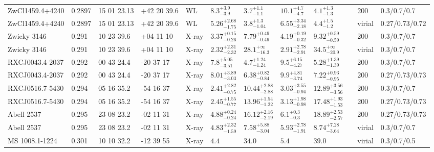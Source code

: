 \begin{landscape}
\begin{center}
{\begin{longtable}{llllllllllll}
ZwCl1459.4+4240 & 0.2897 & 15 01 23.13 & +42 20 39.6 & WL & ${8.3}^{+3.9}_{-3.9}$ & ${3.7}^{+1.1}_{-1.1}$ & ${10.1}^{+4.7}_{-4.7}$ & ${4.1}^{+1.3}_{-1.3}$ & \citet{SE14.1} & 200 & 0.3/0.7/0.7 \\
ZwCl1459.4+4240 & 0.2897 & 15 01 23.13 & +42 20 39.6 & WL & ${5.26}^{+2.68}_{-1.75}$ & ${3.8}^{+1.3}_{-1.04}$ & ${6.55}^{+3.34}_{-2.18}$ & ${4.4}^{+1.5}_{-1.2}$ & \citet{OK10.1} & virial & 0.27/0.73/0.72 \\
Zwicky 3146 & 0.291 & 10 23 39.6 & +04 11 10 & X-ray & ${3.37}^{+0.15}_{-0.26}$ & ${7.79}^{+0.49}_{-0.49}$ & ${4.19}^{+0.19}_{-0.32}$ & ${9.32}^{+0.59}_{-0.59}$ & \citet{ET11.1} & 200 & 0.3/0.7/0.7 \\
Zwicky 3146 & 0.291 & 10 23 39.6 & +04 11 10 & X-ray & ${2.32}^{+2.31}_{-2.32}$ & ${28.1}^{+\infty}_{-16.3}$ & ${2.91}^{+2.78}_{-2.91}$ & ${34.5}^{+\infty}_{-20.9}$ & \citet{SC07.1} & virial & 0.3/0.7/0.7 \\
RXCJ0043.4-2037 & 0.292 & 00 43 24.4 & -20 37 17 & X-ray & ${7.8}^{+5.05}_{-3.51}$ & ${4.7}^{+1.24}_{-1.24}$ & ${9.5}^{+6.15}_{-4.27}$ & ${5.28}^{+1.39}_{-1.39}$ & \citet{ET11.1} & 200 & 0.3/0.7/0.7 \\
RXCJ0043.4-2037 & 0.292 & 00 43 24.4 & -20 37 17 & X-ray & ${8.01}^{+3.89}_{-3.03}$ & ${6.38}^{+0.82}_{-0.84}$ & ${9.9}^{+4.81}_{-3.74}$ & ${7.22}^{+0.93}_{-0.95}$ & \citet{BA14.1} & 200 & 0.27/0.73/0.73 \\
RXCJ0516.7-5430 & 0.294 & 05 16 35.2 & -54 16 37 & X-ray & ${2.41}^{+2.82}_{-0.75}$ & ${10.44}^{+2.88}_{-2.88}$ & ${3.03}^{+3.55}_{-0.94}$ & ${12.89}^{+3.56}_{-3.56}$ & \citet{ET11.1} & 200 & 0.3/0.7/0.7 \\
RXCJ0516.7-5430 & 0.294 & 05 16 35.2 & -54 16 37 & X-ray & ${2.45}^{+1.55}_{-0.77}$ & ${13.96}^{+1.54}_{-1.22}$ & ${3.13}^{+1.98}_{-0.98}$ & ${17.48}^{+1.93}_{-1.53}$ & \citet{BA14.1} & 200 & 0.27/0.73/0.73 \\
Abell 2537 & 0.295 & 23 08 23.2 & -02 11 31 & X-ray & ${4.88}^{+0.24}_{-0.24}$ & ${16.12}^{+2.16}_{-2.19}$ & ${6.1}^{+0.3}_{-0.3}$ & ${18.89}^{+2.53}_{-2.57}$ & \citet{BA14.1} & 200 & 0.27/0.73/0.73 \\
Abell 2537 & 0.295 & 23 08 23.2 & -02 11 31 & X-ray & ${4.83}^{+2.32}_{-1.59}$ & ${7.58}^{+5.88}_{-3.04}$ & ${5.93}^{+2.78}_{-1.91}$ & ${8.74}^{+7.28}_{-3.64}$ & \citet{SC07.1} & virial & 0.3/0.7/0.7 \\
MS 1008.1-1224 & 0.301 & 10 10 32.2 & -12 39 55 & X-ray & ${4.4}^{}_{}$ & ${34.0}^{}_{}$ & ${5.4}^{}_{}$ & ${39.0}^{}_{}$ & \citet{MO99.1} & virial & 0.3/0.7/0.5 \\

\end{longtable}}
\end{center}
\end{landscape}
